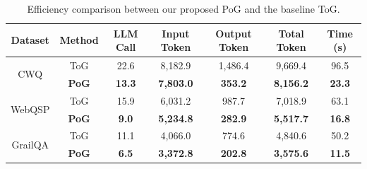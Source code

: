 \documentclass{article}
\begin{document}
\begin{table}[]
\small
\centering
\setlength{\abovecaptionskip}{-3mm}
\setlength{\belowcaptionskip}{-0.1mm}
\caption{Efficiency comparison between our proposed PoG and the baseline ToG.}
\label{Tab:eff_cmp}
\begin{tabular}{ccccccc}

\toprule
\textbf{Dataset}                  & \textbf{Method} & \textbf{LLM Call} & \textbf{Input Token} & \textbf{Output Token} & \textbf{Total Token} & \textbf{Time (s)}   \\ \midrule

\multirow{2}{*}{CWQ}     & ToG   & 22.6   & 8,182.9    & 1,486.4     & 9,669.4    & 96.5 \\
                         & \textbf{PoG}   & \textbf{13.3}   & \textbf{7,803.0}    & \textbf{353.2}      & \textbf{8,156.2}    & \textbf{23.3} \\ \midrule
\multirow{2}{*}{WebQSP}  & ToG   & 15.9   & 6,031.2    & 987.7      & 7,018.9    & 63.1 \\
                         & \textbf{PoG}   & \textbf{9.0}&\textbf{5,234.8}&\textbf{282.9}&\textbf{5,517.7}&\textbf{16.8} \\ \midrule
\multirow{2}{*}{GrailQA} & ToG   & 11.1   & 4,066.0    & 774.6      & 4,840.6    & 50.2 \\
                         & \textbf{PoG}   & \textbf{6.5}    & \textbf{3,372.8}    & \textbf{202.8}      & \textbf{3,575.6}    & \textbf{11.5} \\ 
                         \bottomrule
\end{tabular}
\vspace{-2mm}
\end{table}

\vspace{-2mm}
\end{document}
